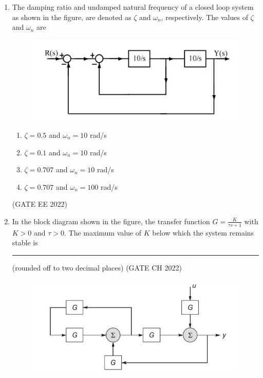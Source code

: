 \begin{enumerate}[label=\thechapter.\arabic*,ref=\thechapter.\theenumi]

\item The damping ratio and undamped natural frequency of a closed loop system as
shown in the figure, are denoted as $\zeta$ and $\omega_n$, respectively. The values of $\zeta$ and $\omega_n$
are 
\begin{figure}[!ht]
\centering
\begin{center}
\includegraphics[width=\columnwidth]{2022/EE/39/figs/question.jpg}
\end{center}
\end{figure}
\begin{enumerate}
    \item $\zeta = 0.5$ and $\omega_n = 10$ rad/s
    \item $\zeta = 0.1$ and $\omega_n = 10$ rad/s
    \item $\zeta = 0.707$ and $\omega_n = 10$ rad/s
    \item $\zeta = 0.707$ and $\omega_n = 100$ rad/s
\end{enumerate}
\hfill(GATE EE 2022)
\solution

\newpage
\item In the block diagram shown in the figure, the transfer function $G=\frac{K}{\tau s+1}$ with $K>0$ and $\tau>0$. The maximum value of $K$ below which the system remains stable is \rule{1cm}{0.15mm}(rounded off to two decimal places) \hfill (GATE CH 2022) 
\begin{figure}[htbp] 
\includegraphics[width=\columnwidth]{2022/CH/58/figs/question.jpg} 
\end{figure}\\ 
\solution 
 
\newpage


\end{enumerate}
